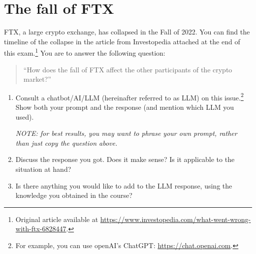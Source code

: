 \documentclass[a4paper]{article}
\newif\ifsolutions
\begin{document}
\section{The fall of FTX}

FTX, a large crypto exchange, has collapsed in the Fall of 2022. You can find the timeline of the collapse in the article from Investopedia attached at the end of this exam.\footnote{Original article available at \url{https://www.investopedia.com/what-went-wrong-with-ftx-6828447}.}
You are to answer the following question: 
\begin{quote}
	``How does the fall of FTX affect the other participants of the crypto market?''
\end{quote}

\begin{enumerate}
	\item Consult a chatbot/AI/LLM (hereinafter referred to as LLM) on this issue.\footnote{For example, you can use openAI's ChatGPT: \url{https://chat.openai.com}.} Show both your prompt and the response (and mention which LLM you used).
	
	\emph{NOTE: for best results, you may want to phrase your own prompt, rather than just copy the question above.}
	
	\item Discuss the response you got. Does it make sense? Is it applicable to the situation at hand?
	
	\item Is there anything you would like to add to the LLM response, using the knowledge you obtained in the course?
\end{enumerate}


\ifsolutions
\end{document}
